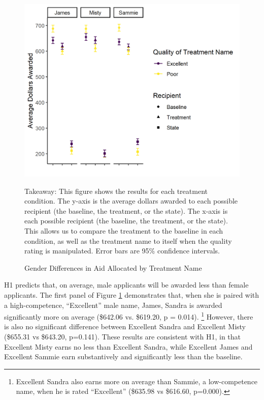 \documentclass[12pt]{article}%
\begin{document}
\begin{doublespace}
\begin{figure}[h!]
	\centering
	\includegraphics[scale=1.2]{figs/general-results-name.png}
	{\singlespacing
		\parbox{0.75\textwidth}{\scriptsize%
			Takeaway: This figure shows the results for each treatment condition. The y-axis is the average dollars awarded to each possible recipient (the baseline, the treatment, or the state). The x-axis is each possible recipient (the baseline, the treatment, or the state). This allows us to compare the treatment to the baseline in each condition, as well as the treatment name to itself when the quality rating is manipulated. Error bars are 95\% confidence intervals.
	}}
	\caption{Gender Differences in Aid Allocated by Treatment Name}
	\label{results-main}
\end{figure}

H1 predicts that, on average, male applicants will be awarded less than female applicants. The first panel of Figure \ref{results-main} demonstrates that, when she is paired with a high-competence, ``Excellent” male name, James, Sandra is awarded significantly more on average (\$642.06 vs. \$619.20, p = 0.014). \footnote{Excellent Sandra also earns more on average than Sammie, a low-competence name, when he is rated ``Excellent” (\$635.98 vs \$616.60, p=0.000).} However, there is also no significant difference between Excellent Sandra and Excellent Misty (\$655.31 vs \$643.20, p=0.141). These results are consistent with H1, in that Excellent Misty earns no less than Excellent Sandra, while Excellent James and Excellent Sammie earn substantively and significantly less than the baseline.


\end{doublespace}
\end{document}
